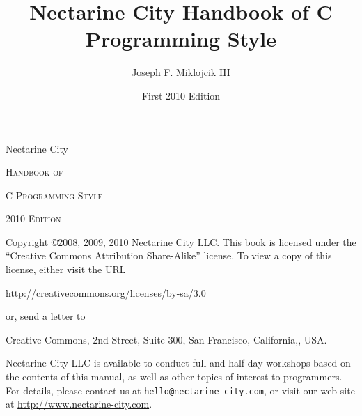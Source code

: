\documentclass{lulu}
\begin{document}
\title{Nectarine City Handbook of C Programming Style}
\author{Joseph F. Miklojcik III}
\date{First 2010 Edition}

\frontmatter

\begin{titlepage}

\vspace*{2in}

\begin{center}
\large{Nectarine City}

\medskip
\huge{\textsc{Handbook of}}

\Huge{\textsc{C Programming Style}}

\vspace*{2in}

\large{\textsc{2010 Edition}}
\end{center}

\newpage

\pagestyle{empty}

\vspace*{3in}

\noindent\small{Copyright \copyright 2008, 2009, 2010 Nectarine City LLC.
  This book is licensed under the ``Creative Commons Attribution
  Share-Alike'' license.  To view a copy of this license, either visit
  the URL}

\smallskip
\begin{center}
\noindent\small{\url{http://creativecommons.org/licenses/by-sa/3.0}}
\end{center}

\smallskip
\noindent\small{or, send a letter to}
\smallskip
\begin{center}
\small{\textsf{Creative Commons, 2nd Street, Suite 300,\linebreak
 San Francisco, California,, USA.}}
\end{center}

Nectarine City LLC is available to conduct full and half-day workshops
based on the contents of this manual, as well as other topics of
interest to programmers.  For details, please contact us at
\texttt{hello@nectarine-city.com}, or visit our web site at
\url{http://www.nectarine-city.com}.

\end{titlepage}


\mainmatter

\pagestyle{myheadings}
\end{document}
